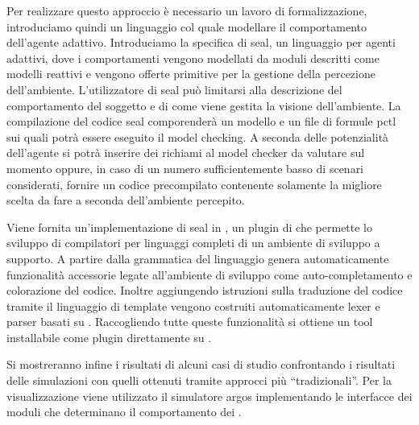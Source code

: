 Per realizzare questo approccio è necessario un lavoro di formalizzazione, introduciamo quindi un linguaggio col quale modellare il comportamento dell'agente adattivo. Introduciamo la specifica di \ac{seal}, un linguaggio per agenti adattivi, dove i comportamenti vengono modellati da moduli descritti come modelli reattivi e vengono offerte primitive per la gestione della percezione dell'ambiente. L'utilizzatore di \ac{seal} può limitarsi alla descrizione del comportamento del soggetto e di come viene gestita la visione dell'ambiente. La compilazione del codice \ac{seal} comporenderà un modello \prism{} e un file di formule \ac{pctl} sui quali potrà essere eseguito il model checking. A seconda delle potenzialità dell'agente si potrà inserire dei richiami al model checker da valutare sul momento oppure, in caso di un numero sufficientemente basso di scenari considerati, fornire un codice precompilato contenente solamente la migliore scelta da fare a seconda dell'ambiente percepito.

Viene fornita un'implementazione di \ac{seal} in \xtext{} \cite{xtext}, un plugin di \eclipse{} che permette lo sviluppo di compilatori per linguaggi completi di un ambiente di sviluppo a supporto. A partire dalla grammatica del linguaggio \xtext{} genera automaticamente funzionalità accessorie legate all'ambiente di sviluppo come auto-completamento e colorazione del codice. Inoltre aggiungendo istruzioni sulla traduzione del codice tramite il linguaggio di template \xtend{} \cite{xtend}
vengono costruiti automaticamente lexer e parser basati su \antlr{} \cite{antlr}.
Raccogliendo tutte queste funzionalità si ottiene un tool installabile come plugin direttamente su \eclipse{}.

Si mostreranno infine i risultati di alcuni casi di studio confrontando i risultati delle simulazioni con quelli ottenuti tramite approcci più ``tradizionali''. Per la visualizzazione viene utilizzato il simulatore \ac{argos} \cite{Pinciroli:IROS2011}
implementando le interfacce dei moduli \cpp{} che determinano il comportamento dei \marxbot{}.


